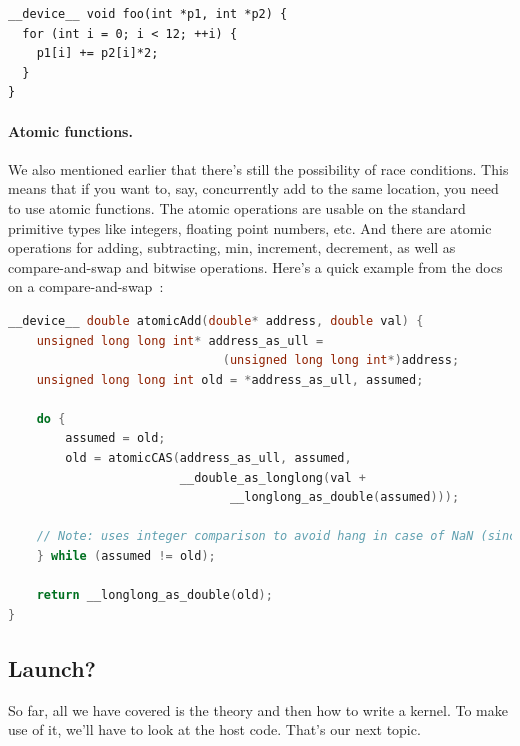 {\scriptsize \hspace*{2em} \begin{minipage}{.5\textwidth}
    \begin{lstlisting}
__device__ void foo(int *p1, int *p2) {
  for (int i = 0; i < 12; ++i) {
    p1[i] += p2[i]*2;
  }
}
    \end{lstlisting}
\end{minipage} }

\paragraph{Atomic functions.}

We also mentioned earlier that there's still the possibility of race conditions. This means that if you want to, say, concurrently add to the same location, you need to use atomic functions. The atomic operations are usable on the standard primitive types like integers, floating point numbers, etc. And there are atomic operations for adding, subtracting, min, increment, decrement, as well as compare-and-swap and bitwise operations. Here's a quick example from the docs on a compare-and-swap~\cite{cuda}:

\begin{lstlisting}[language=C++]
__device__ double atomicAdd(double* address, double val) {
    unsigned long long int* address_as_ull =
                              (unsigned long long int*)address;
    unsigned long long int old = *address_as_ull, assumed;

    do {
        assumed = old;
        old = atomicCAS(address_as_ull, assumed,
                        __double_as_longlong(val +
                               __longlong_as_double(assumed)));

    // Note: uses integer comparison to avoid hang in case of NaN (since NaN != NaN)
    } while (assumed != old);

    return __longlong_as_double(old);
}
\end{lstlisting}

\subsection*{Launch?}

So far, all we have covered is the theory and then how to write a kernel. To make use of it, we'll have to look at the host code. That's our next topic. 






